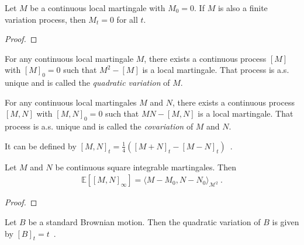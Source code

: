 \begin{theorem}\label{thm:IsLocalMartingale.eq_zero_of_finiteVariation}
Let $M$ be a continuous local martingale with $M_0 = 0$. If $M$ is also a finite variation process, then $M_t = 0$ for all $t$.
\end{theorem}

\begin{proof}

\end{proof}


\begin{definition}\label{def:quadraticVariation}
For any continuous local martingale $M$, there exists a continuous process $[M]$ with $[M]_0 = 0$ such that $M^2 - [M]$ is a local martingale. That process is a.s. unique and is called the \emph{quadratic variation} of $M$.
\end{definition}


\begin{definition}[Covariation]\label{def:covariation}
For any continuous local martingales $M$ and $N$, there exists a continuous process $[M,N]$ with $[M,N]_0 = 0$ such that $MN - [M,N]$ is a local martingale. That process is a.s. unique and is called the \emph{covariation} of $M$ and $N$.

It can be defined by $[M, N]_t = \frac{1}{4}\left([M+N]_t - [M-N]_t \right)$~.
\end{definition}


\begin{lemma}\label{lem:covariation_eq_inner}
Let $M$ and $N$ be continuous square integrable martingales. Then
\begin{align*}
  \mathbb{E}\left[[M,N]_\infty\right] = \langle M - M_0, N - N_0 \rangle_{\mathcal{M}^2}
  \: .
\end{align*}
\end{lemma}

\begin{proof}

\end{proof}


\begin{lemma}\label{lem:quadraticVariation_brownian}
Let $B$ be a standard Brownian motion. Then the quadratic variation of $B$ is given by $[B]_t = t$~.
\end{lemma}

